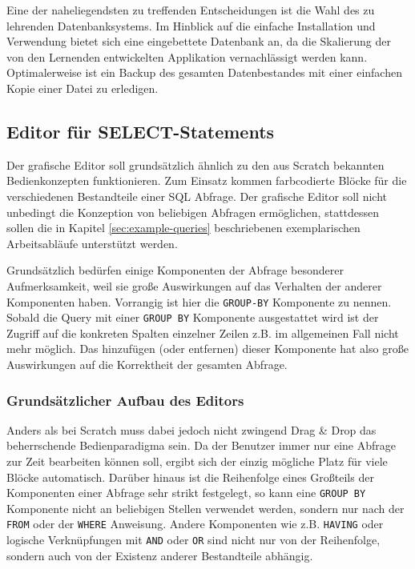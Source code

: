 \documentclass[paper=a4,fontsize=11pt,parskip=half]{scrartcl}
\begin{document}
Eine der naheliegendsten zu treffenden Entscheidungen ist die Wahl des zu lehrenden Datenbanksystems. Im Hinblick auf die einfache Installation und Verwendung bietet sich eine eingebettete Datenbank an, da die Skalierung der von den Lernenden entwickelten Applikation vernachlässigt werden kann. Optimalerweise ist ein Backup des gesamten Datenbestandes mit einer einfachen Kopie einer Datei zu erledigen.


\subsection{Editor für SELECT-Statements}

Der grafische Editor soll grundsätzlich ähnlich zu den aus Scratch bekannten Bedienkonzepten funktionieren. Zum Einsatz kommen farbcodierte Blöcke für die verschiedenen Bestandteile einer SQL Abfrage. Der grafische Editor soll nicht unbedingt die Konzeption von beliebigen Abfragen ermöglichen, stattdessen sollen die in Kapitel \ref{sec:example-queries}  beschriebenen exemplarischen Arbeitsabläufe unterstützt werden.

Grundsätzlich bedürfen einige Komponenten der Abfrage besonderer Aufmerksamkeit, weil sie große Auswirkungen auf das Verhalten der anderer Komponenten haben. Vorrangig ist hier die \texttt{GROUP-BY} Komponente zu nennen. Sobald die Query mit einer \texttt{GROUP BY} Komponente ausgestattet wird ist der Zugriff auf die konkreten Spalten einzelner Zeilen z.B. im allgemeinen Fall nicht mehr möglich. Das hinzufügen (oder entfernen) dieser Komponente hat also große Auswirkungen auf die Korrektheit der gesamten Abfrage.

\subsubsection{Grundsätzlicher Aufbau des Editors}

Anders als bei Scratch muss dabei jedoch nicht zwingend Drag \& Drop das beherrschende Bedienparadigma sein. Da der Benutzer immer nur eine Abfrage zur Zeit bearbeiten können soll, ergibt sich der einzig mögliche Platz für viele Blöcke automatisch. Darüber hinaus ist die Reihenfolge eines Großteils der Komponenten einer Abfrage sehr strikt festgelegt, so kann eine \texttt{GROUP BY} Komponente nicht an beliebigen Stellen verwendet werden, sondern nur nach der \texttt{FROM} oder der \texttt{WHERE} Anweisung. Andere Komponenten wie z.B. \texttt{HAVING} oder logische Verknüpfungen mit \texttt{AND} oder \texttt{OR} sind nicht nur von der Reihenfolge, sondern auch von der Existenz anderer Bestandteile abhängig.
\end{document}
